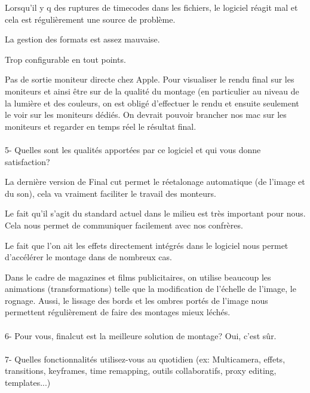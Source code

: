 Lorsqu'il y q des ruptures de timecodes dans les fichiers, le logiciel réagit mal
et cela est régulièrement une source de problème.

La gestion des formats est assez mauvaise.

Trop configurable en tout points.

Pas de sortie moniteur directe chez Apple. Pour visualiser le rendu final sur les
moniteurs et ainsi être sur de la qualité du montage (en particulier au niveau de
la lumière et des couleurs, on est obligé d'effectuer le rendu et ensuite
seulement le voir sur les moniteurs dédiés. On devrait pouvoir brancher nos mac
sur les moniteurs et regarder en temps réel le résultat final.

\paragraph{}
5- Quelles sont les qualités apportées par ce logiciel et qui vous donne satisfaction?

La dernière version de Final cut permet le réetalonage automatique (de l'image
et du son), cela va vraiment faciliter le travail des monteurs.

Le fait qu'il s'agit du standard actuel dans le milieu est très important pour
nous. Cela nous permet de communiquer facilement avec nos confrères.

Le fait que l'on ait les effets directement intégrés dans le logiciel nous
permet d'accélérer le montage dans de nombreux cas.

Dans le cadre de magazines et films publicitaires, on utilise beaucoup les
animations (transformations) telle que la modification de l'échelle de l'image,
le rognage. Aussi, le lissage des bords et les ombres portés de l'image nous
permettent régulièrement de faire des montages mieux léchés.


\paragraph{}
6- Pour vous, finalcut est la meilleure solution de montage?
Oui, c'est sûr.

\paragraph{}
7-  Quelles fonctionnalités utilisez-vous au quotidien (ex: Multicamera, effets,
transitions, keyframes, time remapping, outils collaboratifs, proxy
editing, templates...)

